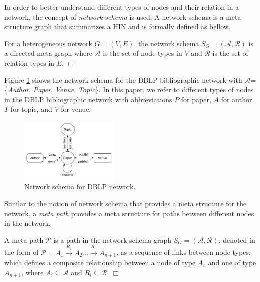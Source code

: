 In order to better understand different types of nodes and their relation in a network, the concept of \textit{network schema} \cite{sun2011pathsim} is used. A network schema is a meta structure graph that summarizes a HIN and is formally defined as bellow.

\begin{definition}
For a heterogeneous network $G=(V,E)$, the network schema $S_G=\mathcal{(A,R)}$ is a directed meta graph where $\mathcal{A}$ is the set of node types in $V$ and $\mathcal{R}$ is the set of relation types in $E$.  $\Box$
\end{definition}

Figure \ref{schema} shows the network schema for the DBLP bibliographic network with $\mathcal{A}$=\{\textit{Author}, \textit{Paper}, \textit{Venue}, \textit{Topic}\}. %
In this paper, we refer to different types of nodes in the DBLP bibliographic network with abbreviations $P$ for paper, $A$ for author, $T$ for topic, and $V$ for venue. 

\begin{figure}[t]
  \centering
      \includegraphics[trim = 0mm 10mm 0mm 0mm,width=0.42\textwidth]{figs/schema.pdf}
  \caption{Network schema for DBLP network.}\label{schema}
\end{figure}


Similar to the notion of network schema that provides a meta structure for the network, a \textit{meta path} \cite{sun2011pathsim} provides a meta structure for paths between different nodes in the network. 

\begin{definition}
A meta path $\mathcal{P}$ is a path in the network schema graph $S_G = (\mathcal{A,R})$, denoted in the form of $\mathcal{P} = A_1 \xrightarrow{R_1} A_2... \xrightarrow{R_n} A_{n+1}$, as a sequence of links between node types, which defines a composite relationship between a node of type $A_1$ and one of type $A_{n+1}$, where $A_i \subseteq \mathcal{A}$ and $R_i \subseteq \mathcal{R}$. $\Box$
\end{definition}

